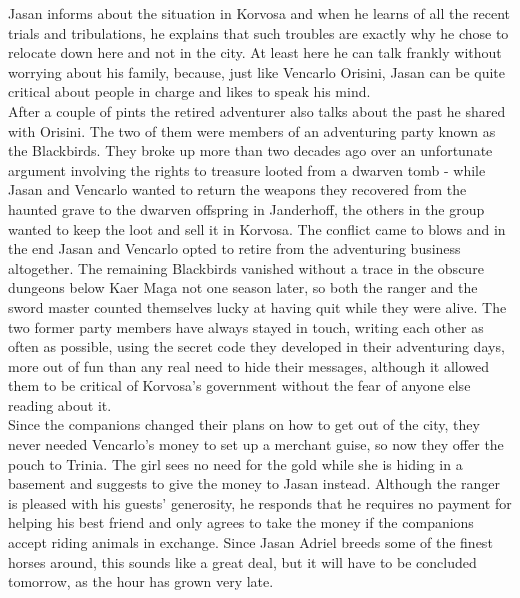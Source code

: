 Jasan informs about the situation in Korvosa and when he learns of all the recent trials and tribulations, he explains that such troubles are exactly why he chose to relocate down here and not in the city. At least here he can talk frankly without worrying about his family, because, just like Vencarlo Orisini, Jasan can be quite critical about people in charge and likes to speak his mind.\\

After a couple of pints the retired adventurer also talks about the past he shared with Orisini. The two of them were members of an adventuring party known as the Blackbirds. They broke up more than two decades ago over an unfortunate argument involving the rights to treasure looted from a dwarven tomb - while Jasan and Vencarlo wanted to return the weapons they recovered from the haunted grave to the dwarven offspring in Janderhoff, the others in the group wanted to keep the loot and sell it in Korvosa. The conflict came to blows and in the end Jasan and Vencarlo opted to retire from the adventuring business altogether. The remaining Blackbirds vanished without a trace in the obscure dungeons below Kaer Maga not one season later, so both the ranger and the sword master counted themselves lucky at having quit while they were alive. The two former party members have always stayed in touch, writing each other as often as possible, using the secret code they developed in their adventuring days, more out of fun than any real need to hide their messages, although it allowed them to be critical of Korvosa's government without the fear of anyone else reading about it.\\

Since the companions changed their plans on how to get out of the city, they never needed Vencarlo's money to set up a merchant guise, so now they offer the pouch to Trinia. The girl sees no need for the gold while she is hiding in a basement and suggests to give the money to Jasan instead. Although the ranger is pleased with his guests' generosity, he responds that he requires no payment for helping his best friend and only agrees to take the money if the companions accept riding animals in exchange. Since Jasan Adriel breeds some of the finest horses around, this sounds like a great deal, but it will have to be concluded tomorrow, as the hour has grown very late.\\

